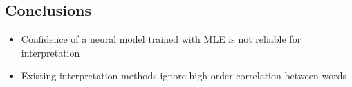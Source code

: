 \documentclass[a0,portrait]{a0poster}
\begin{document}
\begin{multicols}{2}
% 
% 


\section*{Conclusions}
\begin{itemize}
\item Confidence of a neural model trained with MLE is not reliable for
interpretation
\item Existing interpretation methods ignore high-order correlation between
words
\end{itemize}

% 

\end{multicols}
\end{document}
